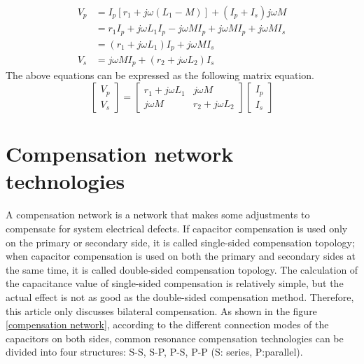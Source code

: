 \begin{equation}
    \begin{align}
        V_p & = I_p[r_1+j\omega(L_1-M)]+(I_p+I_s)j\omega M                           \\
            & = r_1 I_p + j\omega L_1 I_p - j\omega M I_p+j \omega MI_p+j\omega MI_s \\
            & = (r_1+j\omega L_1)I_p + j\omega MI_s                                  \\
        V_s & = j\omega MI_p + (r_2+j \omega L_2)I_s
    \end{align}
\end{equation}
The above equations can be expressed as the following matrix equation.
\begin{equation}
    \begin{bmatrix}
        V_p \\
        V_s
    \end{bmatrix}
    =
    \begin{bmatrix}
        r_1 + j\omega L_1 & j\omega M \\
        j\omega M & r_2+ j\omega L_2 
    \end{bmatrix}
    \begin{bmatrix}
        I_p \\
        I_s
    \end{bmatrix}
\end{equation}


\section{Compensation network technologies}
A compensation network is a network that makes some adjustments to compensate for system electrical defects. If capacitor compensation is used only on the primary or secondary side, it is called single-sided compensation topology; when capacitor compensation is used on both the primary and secondary sides at the same time, it is called double-sided compensation topology. The calculation of the capacitance value of single-sided compensation is relatively simple, but the actual effect is not as good as the double-sided compensation method. Therefore, this article only discusses bilateral compensation. As shown in the figure \ref{compensation network}, according to the different connection modes of the capacitors on both sides, common resonance compensation technologies can be divided into four structures: S-S, S-P, P-S, P-P (S: series, P:parallel).

